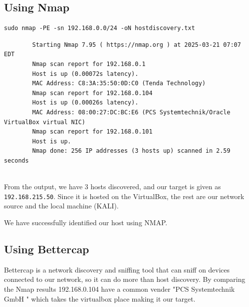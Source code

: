 \documentclass[a4paper,12pt]{article}
\begin{document}
\subsection{Using Nmap}

\begin{verbatim}
sudo nmap -PE -sn 192.168.0.0/24 -oN hostdiscovery.txt
\end{verbatim}

\begin{verbatim}
        Starting Nmap 7.95 ( https://nmap.org ) at 2025-03-21 07:07 EDT
        Nmap scan report for 192.168.0.1
        Host is up (0.00072s latency).
        MAC Address: C8:3A:35:50:0D:C0 (Tenda Technology)
        Nmap scan report for 192.168.0.104
        Host is up (0.00026s latency).
        MAC Address: 08:00:27:DC:BC:E6 (PCS Systemtechnik/Oracle VirtualBox virtual NIC)
        Nmap scan report for 192.168.0.101
        Host is up.
        Nmap done: 256 IP addresses (3 hosts up) scanned in 2.59 seconds
        
\end{verbatim}

From the output, we have 3 hosts discovered, and our target is given as \texttt{192.168.215.50}. Since it is hosted on the VirtualBox, the rest are our network source and the local machine (KALI).

We have successfully identified our host using NMAP.

\subsection{Using Bettercap}

Bettercap is a network discovery and sniffing tool that can sniff on devices connected to our network, so it can do more than host discovery.
By comparing the Nmap results 192.168.0.104 have a common vender "PCS Systemtechnik GmbH " which takes the virtualbox place making it our target.
\end{document}
